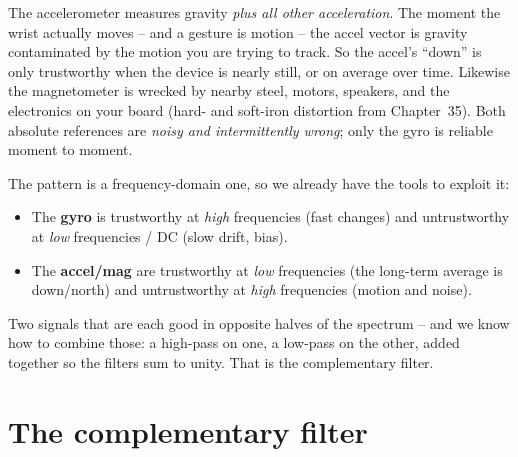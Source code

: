 \begin{trapbox}
The accelerometer measures gravity \emph{plus all other acceleration}. The moment the
wrist actually moves -- and a gesture is motion -- the accel vector is
gravity contaminated by the motion you are trying to track. So the accel's ``down'' is
only trustworthy when the device is nearly still, or on average over time. Likewise the
magnetometer is wrecked by nearby steel, motors, speakers, and the electronics on
your board (hard- and soft-iron distortion from Chapter~35). Both
absolute references are \emph{noisy and intermittently wrong}; only the gyro is reliable
moment to moment.
\end{trapbox}

The pattern is a frequency-domain one, so we already
have the tools to exploit it:
\begin{itemize}
  \item The \textbf{gyro} is trustworthy at \emph{high} frequencies (fast changes) and
        untrustworthy at \emph{low} frequencies / DC (slow drift, bias).
  \item The \textbf{accel/mag} are trustworthy at \emph{low} frequencies (the long-term
        average is down/north) and untrustworthy at \emph{high} frequencies
        (motion and noise).
\end{itemize}
Two signals that are each good in opposite halves of the spectrum -- and we know
how to combine those: a high-pass on one, a low-pass on the other, added together so the
filters sum to unity. That is the complementary filter.

\section{The complementary filter}
\label{ch36:complementary}

